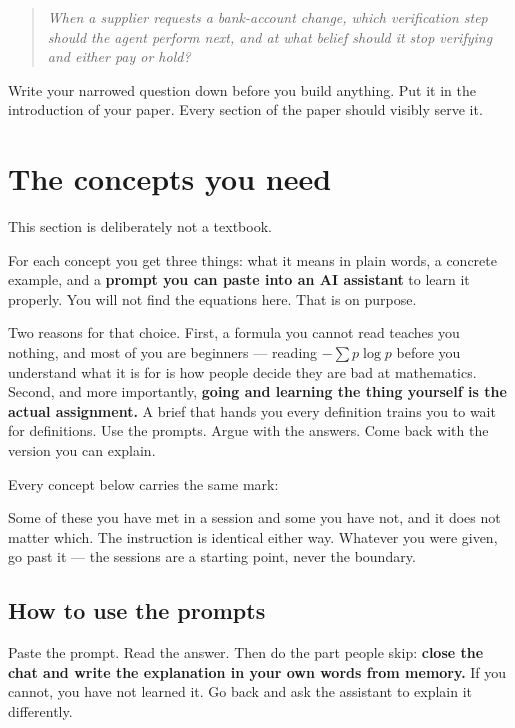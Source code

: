 \documentclass[11pt,a4paper]{article}
\begin{document}
\begin{quote}
\itshape
When a supplier requests a bank-account change, which verification step should the agent
perform next, and at what belief should it stop verifying and either pay or hold?
\end{quote}

Write your narrowed question down before you build anything. Put it in the introduction of
your paper. Every section of the paper should visibly serve it.

\section{The concepts you need}
\label{sec:concepts}

This section is deliberately not a textbook.

For each concept you get three things: what it means in plain words, a concrete example, and a
\textbf{prompt you can paste into an AI assistant} to learn it properly. You will not find the
equations here. That is on purpose.

Two reasons for that choice. First, a formula you cannot read teaches you nothing, and most of
you are beginners --- reading $-\sum p \log p$ before you understand what it is for is how people
decide they are bad at mathematics. Second, and more importantly, \textbf{going and learning the
thing yourself is the actual assignment.} A brief that hands you every definition trains you to
wait for definitions. Use the prompts. Argue with the answers. Come back with the version you
can explain.

Every concept below carries the same mark:

\vspace{4pt}

\vspace{4pt}
Some of these you have met in a session and some you have not, and it does not matter which. The
instruction is identical either way. Whatever you were given, go past it --- the sessions are a
starting point, never the boundary.

\subsection{How to use the prompts}

Paste the prompt. Read the answer. Then do the part people skip: \textbf{close the chat and write
the explanation in your own words from memory.} If you cannot, you have not learned it. Go back
and ask the assistant to explain it differently.
\end{document}
